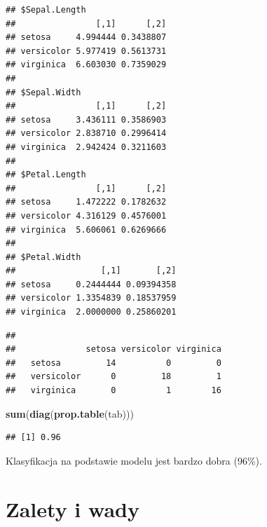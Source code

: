 \documentclass[]{book}
\newenvironment{Shaded}{\begin{snugshade}}{\end{snugshade}}
\newcommand{\DataTypeTok}[1]{\textcolor[rgb]{0.13,0.29,0.53}{#1}}
\newcommand{\KeywordTok}[1]{\textcolor[rgb]{0.13,0.29,0.53}{\textbf{#1}}}
\newcommand{\NormalTok}[1]{#1}
\newcommand{\OperatorTok}[1]{\textcolor[rgb]{0.81,0.36,0.00}{\textbf{#1}}}
\newcommand{\StringTok}[1]{\textcolor[rgb]{0.31,0.60,0.02}{#1}}
\theoremstyle{plain}
\theoremstyle{definition}
\theoremstyle{definition}
\theoremstyle{definition}
\theoremstyle{definition}
\theoremstyle{remark}
\begin{document}
\begin{verbatim}
## $Sepal.Length
##                [,1]      [,2]
## setosa     4.994444 0.3438807
## versicolor 5.977419 0.5613731
## virginica  6.603030 0.7359029
## 
## $Sepal.Width
##                [,1]      [,2]
## setosa     3.436111 0.3586903
## versicolor 2.838710 0.2996414
## virginica  2.942424 0.3211603
## 
## $Petal.Length
##                [,1]      [,2]
## setosa     1.472222 0.1782632
## versicolor 4.316129 0.4576001
## virginica  5.606061 0.6269666
## 
## $Petal.Width
##                 [,1]       [,2]
## setosa     0.2444444 0.09394358
## versicolor 1.3354839 0.18537959
## virginica  2.0000000 0.25860201
\end{verbatim}

\begin{Shaded}
\end{Shaded}

\begin{verbatim}
##             
##              setosa versicolor virginica
##   setosa         14          0         0
##   versicolor      0         18         1
##   virginica       0          1        16
\end{verbatim}

\begin{Shaded}
\begin{Highlighting}[]
\KeywordTok{sum}\NormalTok{(}\KeywordTok{diag}\NormalTok{(}\KeywordTok{prop.table}\NormalTok{(tab)))}
\end{Highlighting}
\end{Shaded}

\begin{verbatim}
## [1] 0.96
\end{verbatim}

Klasyfikacja na podstawie modelu jest bardzo dobra (96\%).

\hypertarget{zalety-i-wady-1}{%
\section{Zalety i wady}\label{zalety-i-wady-1}}
\end{document}
